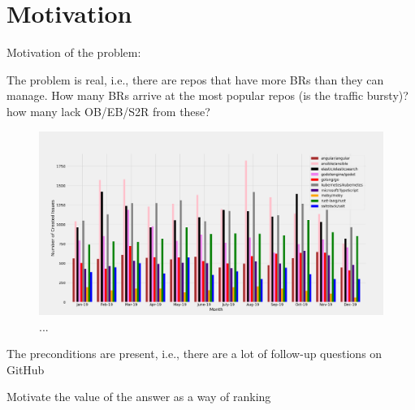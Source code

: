 \section{Motivation}



Motivation of the problem:

The problem is real, i.e., there are repos that have more BRs than they can manage. How many BRs arrive at the most popular repos (is the traffic bursty)? how many lack OB/EB/S2R from these?

\begin{figure}[t]
\centering
\includegraphics[width=0.79\linewidth]{figures/repos_month_bar.png}
\caption{...}
\label{fig:repo_activity}
\end{figure}



The preconditions are present, i.e., there are a lot of follow-up questions on GitHub






Motivate the value of the answer as a way of ranking

